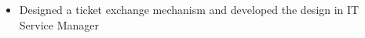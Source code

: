 \documentclass[10pt,a4paper,ragged2e,withhyper]{altacv}
\begin{document}
\begin{itemize}
\item Designed a ticket exchange mechanism and developed the design in IT Service Manager
\end{itemize}

\bigskip
\end{document}
